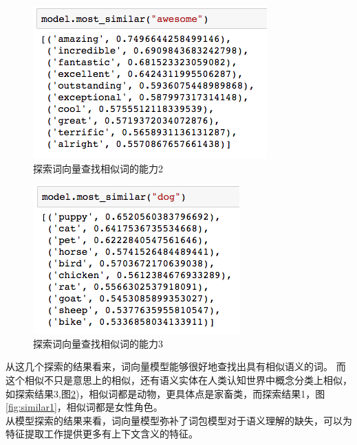 \begin{figure}[h]
	\centering
	\includegraphics[width=0.8\linewidth]{similar2}
	\caption[similar2]{探索词向量查找相似词的能力2}
	\label{fig:similar2}
\end{figure}
\begin{figure}[h]
	\centering
	\includegraphics[width=0.8\linewidth]{similar3}
	\caption[similar3]{探索词向量查找相似词的能力3}
	\label{fig:similar3}
\end{figure}

从这几个探索的结果看来，词向量模型能够很好地查找出具有相似语义的词。
而这个相似不只是意思上的相似，还有语义实体在人类认知世界中概念分类上相似，如探索结果3,图\ref{fig:similar3})，相似词都是动物，更具体点是家畜类，而探索结果1，图\ref{fig:similar1}，相似词都是女性角色。\\
从模型探索的结果来看，词向量模型弥补了词包模型对于语义理解的缺失，可以为特征提取工作提供更多有上下文含义的特征。\\